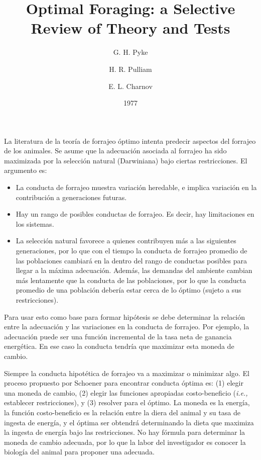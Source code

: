 \documentclass[a4paper,12pt]{article}
\title{Optimal Foraging: a Selective Review of Theory and Tests}
\author{G. H. Pyke \and H. R. Pulliam \and E. L. Charnov}
\date{1977}
\begin{document}
{\scshape\bfseries \maketitle}

La literatura de la teoría de forrajeo óptimo intenta predecir aspectos del forrajeo de los animales. Se asume que la adecuación asociada al forrajeo ha sido maximizada por la selección natural (Darwiniana) bajo ciertas restricciones. El argumento es:

\begin{itemize}
	\item La conducta de forrajeo muestra variación heredable, e implica variación en la contribución a generaciones futuras.
	\item Hay un rango de posibles conductas de forrajeo. Es decir, hay limitaciones en los sistemas.
	\item La selección natural favorece a quienes contribuyen más a las siguientes generaciones, por lo que con el tiempo la conducta de forrajeo promedio de las poblaciones cambiará en la dentro del rango de conductas posibles para llegar a la máxima adecuación. Además, las demandas del ambiente cambian más lentamente que la conducta de las poblaciones, por lo que la conducta promedio de una población debería estar cerca de lo óptimo (sujeto a sus restricciones).
\end{itemize}

Para usar esto como base para formar hipótesis se debe determinar la relación entre la adecuación y las variaciones en la conducta de forrajeo. Por ejemplo, la adecuación puede ser una función incremental de la tasa neta de ganancia energética. En ese caso la conducta tendría que maximizar esta moneda de cambio.

Siempre la conducta hipotética de forrajeo va a maximizar o minimizar algo. El proceso propuesto por Schoener para encontrar conducta óptima es: (1) elegir una moneda de cambio, (2) elegir las funciones apropiadas costo-beneficio ({\itshape i.e.,} establecer restricciones), y (3) resolver para el óptimo. La moneda es la energía, la función costo-beneficio es la relación entre la diera del animal y su tasa de ingesta de energía, y el óptima ser obtendrá determinando la dieta que maximiza la ingesta de energía bajo las restricciones. No hay fórmula para determinar la moneda de cambio adecuada, por lo que la labor del investigador es conocer la biología del animal para proponer una adecuada.
\end{document}
